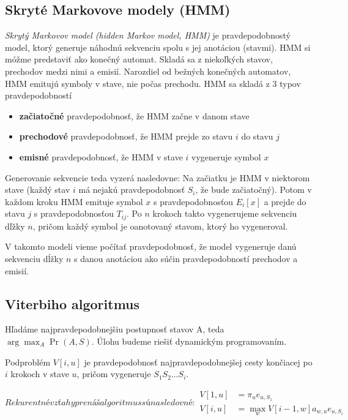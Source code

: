 \subsection{Skryté Markovove modely (HMM)}
\textit{Skrytý Markovov model (hidden Markov model, HMM)} je pravdepodobnostý model, ktorý generuje náhodnú sekvenciu spolu s jej anotáciou (stavmi). HMM si móžme predstaviť ako konečný automat. Skladá sa z niekoľkých stavov, prechodov medzi nimi a emisií. Narozdiel od bežných konečných automatov, HMM emitujú symboly v stave, nie počas prechodu.
HMM sa skladá z 3 typov pravdepodobností
\begin{itemize}
\item \textbf{začiatočné} pravdepodobnosť, že HMM začne v danom stave
\item \textbf{prechodové} pravdepodobnosť, že HMM prejde zo stavu $i$ do stavu $j$
\item \textbf{emisné} pravdepodobnosť, že HMM v stave $i$ vygeneruje symbol $x$
\end{itemize}

Generovanie sekvencie teda vyzerá nasledovne: Na začiatku je HMM v niektorom stave (každý stav $i$ má nejakú pravdepodobnosť $S_i$, že bude začiatočný). Potom v každom kroku HMM emituje symbol $x$ s pravdepodobnosťou $E_i[x]$ a prejde do stavu $j$ s pravdepodobnosťou $T_{ij}$. Po $n$ krokoch takto vygenerujeme sekvenciu dľžky $n$, pričom každý symbol je oanotovaný stavom, ktorý ho vygeneroval.

V takomto modeli vieme počítať pravdepodobnosť, že model vygeneruje danú sekvenciu dĺžky $n$ s danou anotáciou ako súčin pravdepodobností prechodov a emisií. \cite{skripta, durbin}

\subsection{Viterbiho algoritmus}

Hľadáme najpravdepodobnejšiu postupnosť stavov A, teda $\arg\max_A \Pr(A, S)$. Úlohu budeme riešiť dynamickým programovaním.

Podproblém $V[i,u]$ je pravdepodobnosť najpravdepodobnejšej cesty končiacej po $i$ krokoch v stave $u$, pričom vygeneruje $S_1 S_2 \dots S_i$.

\begin{subequations}
Rekurentné vzťahy pre náš algoritmus sú nasledovné:
\begin{align}
        \label{eq:viterbi-init}
        V[1,u] &= \pi_u e_{u,S_1}\\
        \label{eq:viterbi-step}
        V[i,u] &= \max_w V[i-1, w] a_{w,u} e_{u,S_i}
\end{align}
\end{subequations}

